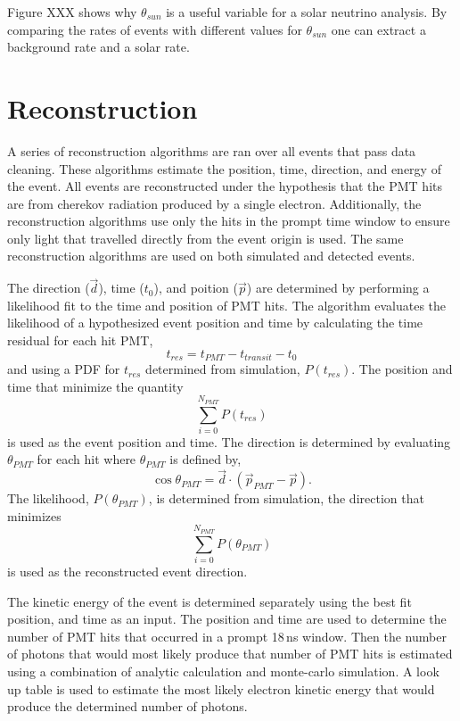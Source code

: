 Figure XXX shows why $\theta_{sun}$ is a useful variable for a solar neutrino analysis.
By comparing the rates of events with different values for $\theta_{sun}$ one can
extract a background rate and a solar rate.

\section{Reconstruction}
A series of reconstruction algorithms are ran over all events that pass data cleaning.
These algorithms estimate the position, time, direction, and energy of the event.
All events are reconstructed under the hypothesis that the PMT hits are from cherekov radiation
produced by a single electron.
Additionally, the reconstruction algorithms use only the hits in the prompt time window to ensure only light
that travelled directly from the event origin is used.
The same reconstruction algorithms are used on both simulated and detected events.

The direction ($\vec{d}$), time ($t_{0}$), and poition ($\vec{p}$) are determined by performing a likelihood
fit to the time and position of PMT hits.
The algorithm evaluates the likelihood of a hypothesized event position and time by
calculating the time residual for each hit PMT,
\begin{equation}
    \label{eqn:tres}
t_{res} = t_{PMT} - t_{transit} - t_{0}
\end{equation}
and using a PDF for $t_{res}$ determined from simulation, $P(t_{res})$.
The position and time that minimize the quantity
\begin{equation}
\sum_{i=0}^{N_{PMT}} P(t_{res}) %
\end{equation}
is used as the event position and time.
The direction is determined by evaluating $\theta_{PMT}$ for each hit where
$\theta_{PMT}$ is defined by,
\begin{equation}
    \cos\theta_{PMT} = \vec{d}\cdot\left(\vec{p}_{PMT} - \vec{p}\right)\text{.}
\end{equation}
The likelihood, $P(\theta_{PMT})$, is determined from simulation, the direction
that minimizes
\begin{equation}
\sum_{i=0}^{N_{PMT}} P(\theta_{PMT})
\end{equation}
is used as the reconstructed event direction.

The kinetic energy of the event is determined separately
using the best fit position, and time as an input.
The position and time are used to determine the number of PMT
hits that occurred in a prompt 18\,ns window.
Then the number of photons that would most likely produce
that number of PMT hits is estimated using a combination of
analytic calculation and monte-carlo simulation.
A look up table is used to estimate the most likely electron
kinetic energy that would produce the determined number of photons.

